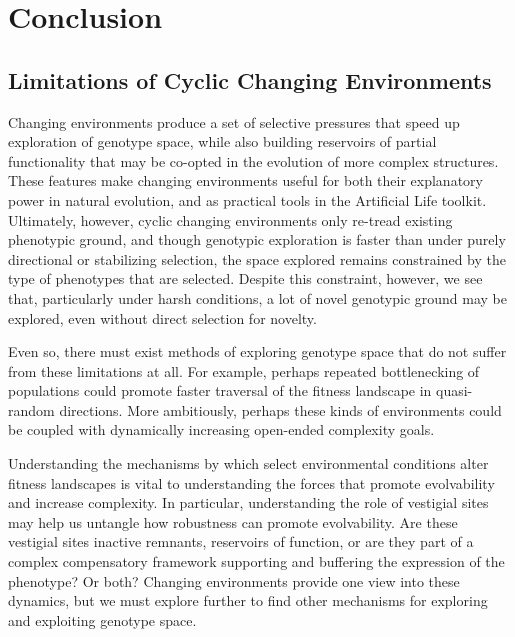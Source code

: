 \documentclass[PhD]{msu-thesis}
\begin{document}

\chapter{Conclusion}
\label{chap:conclusion}

\section{Limitations of Cyclic Changing Environments}
Changing environments produce a set of selective pressures that speed up exploration of genotype space, while also building reservoirs of partial functionality that may be co-opted in the evolution of more complex structures. These features make changing environments useful for both their explanatory power in natural evolution, and as practical tools in the Artificial Life toolkit.
Ultimately, however, cyclic changing environments only re-tread existing phenotypic ground, and though genotypic exploration is faster than under purely directional or stabilizing selection, the space explored remains constrained by the type of phenotypes that are selected. Despite this constraint, however, we see that, particularly under harsh conditions, a lot of novel genotypic ground may be explored, even without direct selection for novelty. 

Even so, there must exist methods of exploring genotype space that do not suffer from these limitations at all.
For example, perhaps repeated bottlenecking of populations could promote faster traversal of the fitness landscape in quasi-random directions. More ambitiously, perhaps these kinds of environments could be coupled with dynamically increasing open-ended complexity goals.

Understanding the mechanisms by which select environmental conditions alter fitness landscapes is vital to understanding the forces that promote evolvability and increase complexity. In particular, understanding the role of vestigial sites may help us untangle how robustness can promote evolvability. Are these vestigial sites inactive remnants, reservoirs of function, or are they part of a complex compensatory framework supporting and buffering the expression of the phenotype? Or both? Changing environments provide one view into these dynamics, but we must explore further to find other mechanisms for exploring and exploiting genotype space.
\end{document}
